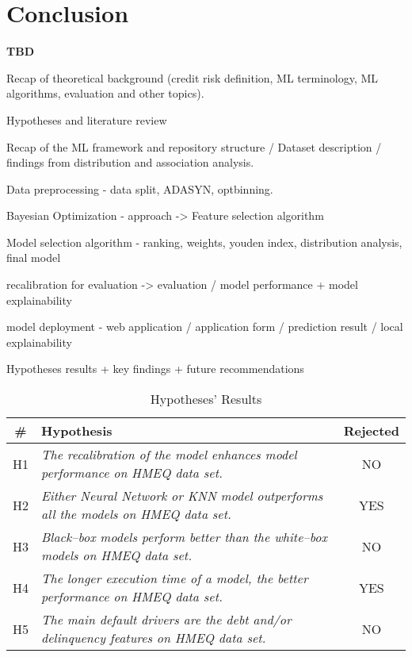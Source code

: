 \chapter{Conclusion}
\label{conclusion}

\textbf{TBD}

Recap of theoretical background (credit risk definition, ML terminology, ML algorithms, evaluation and other topics).

Hypotheses and literature review

Recap of the ML framework and repository structure / Dataset description / findings from distribution and association analysis.

Data preprocessing - data split, ADASYN, optbinning.

Bayesian Optimization - approach -> Feature selection algorithm

Model selection algorithm - ranking, weights, youden index, distribution analysis, final model

recalibration for evaluation -> evaluation / model performance + model explainability

model deployment - web application / application form / prediction result / local explainability

Hypotheses results + key findings + future recommendations


\begin{table}[H]
    \small
    \setlength{\tabcolsep}{8pt}
    \centering
    \caption[Hypotheses' Results]{Hypotheses' Results}\label{tab:hypoconclusion}
    \renewcommand{\arraystretch}{1.5}
    \begin{tabular}{c p{10cm} c}
    \toprule
    \textbf{\#} & \textbf{Hypothesis} & \textbf{Rejected} \\
    \midrule
    \hline
    H1 & \textit{The recalibration of the model enhances model performance on HMEQ data set.} & NO \\
    H2 & \textit{Either Neural Network or KNN model outperforms all the models on HMEQ data set.} & YES \\
    H3 & \textit{Black--box models perform better than the white--box models on HMEQ data set.} & NO \\
    H4 & \textit{The longer execution time of a model, the better performance on HMEQ data set.} & YES \\
    H5 & \textit{The main default drivers are the debt and/or delinquency features on HMEQ data set.} & NO \\
    \hline
    \bottomrule
    \end{tabular}
    \vspace{0.35em}
    
    \vspace{-1em}
\end{table}